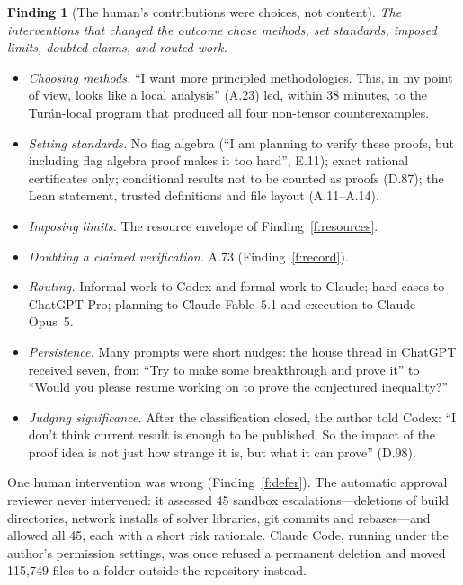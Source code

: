 \documentclass[11pt,a4paper]{article}
\newtheorem{finding}{Finding}
\begin{document}
\begin{finding}[The human's contributions were choices, not content]\label{f:human}
The interventions that changed the outcome chose methods, set standards, imposed limits, doubted claims, and
routed work.
\end{finding}
\begin{itemize}
\item \emph{Choosing methods.} ``I want more principled methodologies. This, in my point of view, looks like a
  local analysis'' (A.23) led, within 38 minutes, to the Tur\'an-local program that produced all four non-tensor
  counterexamples.
\item \emph{Setting standards.} No flag algebra (``I am planning to verify these proofs, but including flag
  algebra proof makes it too hard'', E.11); exact rational certificates only; conditional results not to be
  counted as proofs (D.87); the Lean statement, trusted definitions and file layout (A.11--A.14).
\item \emph{Imposing limits.} The resource envelope of Finding~\ref{f:resources}.
\item \emph{Doubting a claimed verification.} A.73 (Finding~\ref{f:record}).
\item \emph{Routing.} Informal work to Codex and formal work to Claude; hard cases to ChatGPT Pro; planning to
  Claude Fable~5.1 and execution to Claude Opus~5.
\item \emph{Persistence.} Many prompts were short nudges: the house thread in ChatGPT received seven, from
  ``Try to make some breakthrough and prove it'' to ``Would you please resume working on to prove the conjectured
  inequality?''
\item \emph{Judging significance.} After the classification closed, the author told Codex: ``I don't think current
  result is enough to be published. So the impact of the proof idea is not just how strange it is, but what it
  can prove'' (D.98).
\end{itemize}
One human intervention was wrong (Finding~\ref{f:defer}). The automatic approval reviewer never intervened: it
assessed 45 sandbox escalations---deletions of build directories, network installs of solver libraries, git
commits and rebases---and allowed all 45, each with a short risk rationale. Claude Code, running under the
author's permission settings, was once refused a permanent deletion and moved 115,749 files to a folder outside
the repository instead.

\end{document}
